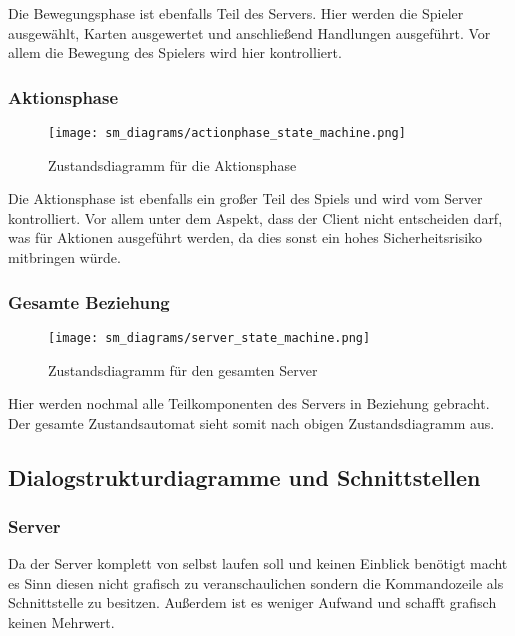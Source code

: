 \documentclass{uulm-assignment}
\begin{document}
        Die Bewegungsphase ist ebenfalls Teil des Servers. Hier werden die Spieler ausgewählt, Karten ausgewertet
        und anschließend Handlungen ausgeführt. Vor allem die Bewegung des Spielers wird hier kontrolliert.

    \newpage
    \subsubsection{Aktionsphase}
        \begin{figure}[ht]
            \centering
            \texttt{[image: sm\_diagrams/actionphase\_state\_machine.png]}
            \caption{Zustandsdiagramm für die Aktionsphase}
            \label{actionphase-sm-diagram}
        \end{figure}

        Die Aktionsphase ist ebenfalls ein großer Teil des Spiels und wird vom Server kontrolliert.
        Vor allem unter dem Aspekt, dass der Client nicht entscheiden darf, was für Aktionen ausgeführt werden, da
        dies sonst ein hohes Sicherheitsrisiko mitbringen würde.

    \newpage
    \subsubsection{Gesamte Beziehung}
        \begin{figure}[ht]
            \centering
            \texttt{[image: sm\_diagrams/server\_state\_machine.png]}
            \caption{Zustandsdiagramm für den gesamten Server}
            \label{server-sm-diagram}
        \end{figure}

        Hier werden nochmal alle Teilkomponenten des Servers in Beziehung gebracht. Der gesamte Zustandsautomat sieht
        somit nach obigen Zustandsdiagramm aus.
    

\subsection{Dialogstrukturdiagramme und Schnittstellen}

    \subsubsection{Server}
Da der Server komplett von selbst laufen soll und keinen Einblick benötigt macht es Sinn diesen nicht grafisch zu veranschaulichen sondern die Kommandozeile als Schnittstelle zu besitzen. 
Außerdem ist es weniger Aufwand und schafft grafisch keinen Mehrwert.
\end{document}
